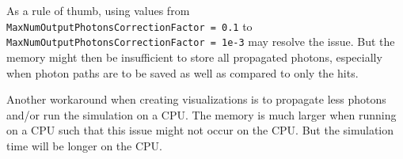 As a rule of thumb, using values from
\texttt{MaxNumOutputPhotonsCorrectionFactor\ =\ 0.1} to
\texttt{MaxNumOutputPhotonsCorrectionFactor\ =\ 1e-3} may resolve the
issue. But the memory might then be insufficient to store all propagated
photons, especially when photon paths are to be saved as well as
compared to only the hits.

Another workaround when creating visualizations is to propagate less
photons and/or run the simulation on a CPU. The memory is much larger
when running on a CPU such that this issue might not occur on the CPU.
But the simulation time will be longer on the CPU.

